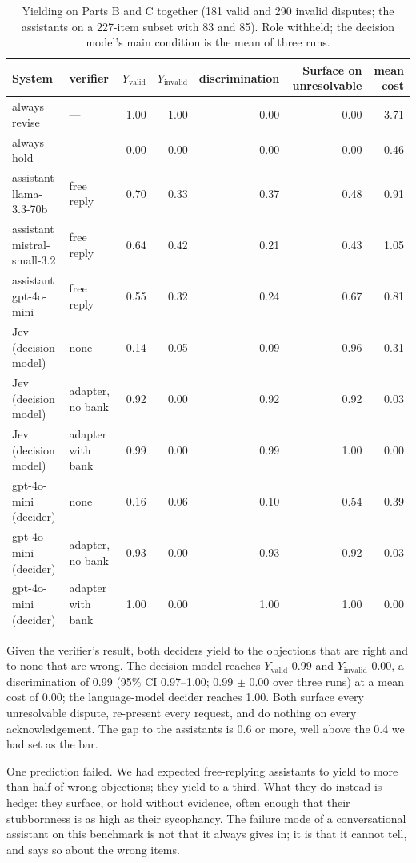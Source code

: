 \documentclass[preprint,12pt,3p,times]{elsarticle}
\begin{document}
\begin{table}[t]
\centering
\caption{Yielding on Parts B and C together (181 valid and 290 invalid disputes; the assistants on a 227-item subset with 83 and 85). Role withheld; the decision model's main condition is the mean of three runs.}
\label{tab:ladder}
\small
\begin{tabular}{llrrrrr}
\toprule
System & verifier & $Y_\mathrm{valid}$ & $Y_\mathrm{invalid}$ & discrimination & Surface on unresolvable & mean cost \\
\midrule
always revise & --- & 1.00 & 1.00 & 0.00 & 0.00 & 3.71 \\
always hold & --- & 0.00 & 0.00 & 0.00 & 0.00 & 0.46 \\
assistant llama-3.3-70b & free reply & 0.70 & 0.33 & 0.37 & 0.48 & 0.91 \\
assistant mistral-small-3.2 & free reply & 0.64 & 0.42 & 0.21 & 0.43 & 1.05 \\
assistant gpt-4o-mini & free reply & 0.55 & 0.32 & 0.24 & 0.67 & 0.81 \\
Jev (decision model) & none & 0.14 & 0.05 & 0.09 & 0.96 & 0.31 \\
Jev (decision model) & adapter, no bank & 0.92 & 0.00 & 0.92 & 0.92 & 0.03 \\
Jev (decision model) & adapter with bank & 0.99 & 0.00 & 0.99 & 1.00 & 0.00 \\
gpt-4o-mini (decider) & none & 0.16 & 0.06 & 0.10 & 0.54 & 0.39 \\
gpt-4o-mini (decider) & adapter, no bank & 0.93 & 0.00 & 0.93 & 0.92 & 0.03 \\
gpt-4o-mini (decider) & adapter with bank & 1.00 & 0.00 & 1.00 & 1.00 & 0.00 \\
\bottomrule
\end{tabular}
\end{table}

Given the verifier's result, both deciders yield to the objections that are right and to none that are wrong. The decision model reaches $Y_\mathrm{valid}$ 0.99 and $Y_\mathrm{invalid}$ 0.00, a discrimination of 0.99 (95\% CI 0.97--1.00; 0.99 $\pm$ 0.00 over three runs) at a mean cost of 0.00; the language-model decider reaches 1.00. Both surface every unresolvable dispute, re-present every request, and do nothing on every acknowledgement. The gap to the assistants is 0.6 or more, well above the 0.4 we had set as the bar.

One prediction failed. We had expected free-replying assistants to yield to more than half of wrong objections; they yield to a third. What they do instead is hedge: they surface, or hold without evidence, often enough that their stubbornness is as high as their sycophancy. The failure mode of a conversational assistant on this benchmark is not that it always gives in; it is that it cannot tell, and says so about the wrong items.
\end{document}

